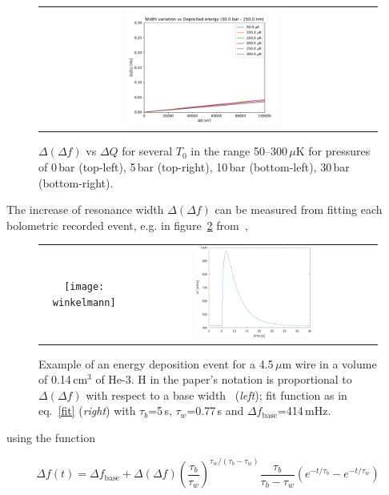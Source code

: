 \documentclass[a4paper,10pt]{article}
\begin{document}
\begin{figure}[!ht]
\begin{center}
\begin{tabular}{cc}
    \includegraphics[width=0.49\textwidth]{DeltaDeltaW_vs_DE-30bar}
  \end{tabular}
  \end{center}
  \caption{$\Delta(\Delta f)$ vs $\Delta Q$ for several $T_0$ in the range 50--300\,$\mu$K for pressures of 0\,bar (top-left), 5\,bar (top-right), 10\,bar (bottom-left), 30\,bar (bottom-right).}
  \label{fig:DeltaDeltaWvsDE}
\end{figure}

The increase of resonance width $\Delta (\Delta f)$ can be measured from fitting each bolometric recorded event, e.g. in figure~\ref{fig:winkelmann} from~\cite{winkelmann},
\begin{figure}[!ht]
  \begin{center}
    \begin{tabular}{cc}
    \texttt{[image: winkelmann]} &
    \includegraphics[width=0.49\textwidth]{winkelmann_fit.pdf}
    \end{tabular}
  \end{center}
  \caption{Example of an energy deposition event for a 4.5\,$\mu$m wire in a volume of 0.14\,cm$^3$ of He-3. H in the paper's notation is proportional to $\Delta (\Delta f)$ with respect to a base width~\cite{winkelmann} (\textit{left}); fit function as in eq.~\ref{fit} (\textit{right}) with $\tau_b$=5\,s, $\tau_w$=0.77\,s and $\Delta f_\mathrm{base}$=414\,mHz.}
  \label{fig:winkelmann}
\end{figure}
using the function

\begin{equation}
  \Delta f(t)= \Delta f_\mathrm{base} + \Delta (\Delta f) {\left( \frac{\tau_b}{\tau_w} \right)}^{\tau_w/(\tau_b-\tau_w)} \frac{\tau_b}{\tau_b - \tau_w} \left( e^{-t/\tau_b} - e^{-t/\tau_w} \right)
\label{fit}
\end{equation}
\end{document}
